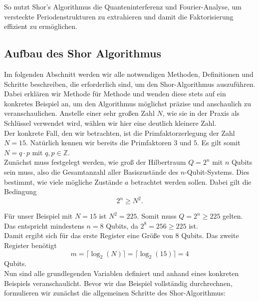 So nutzt Shor's Algorithmus die Quanteninterferenz und Fourier-Analyse, um versteckte Periodenstrukturen zu extrahieren und damit die Faktorisierung effizient zu ermöglichen.

\subsection{Aufbau des Shor Algorithmus}

Im folgenden Abschnitt werden wir alle notwendigen Methoden, Definitionen und Schritte beschreiben, die erforderlich sind, um den Shor-Algorithmus auszuführen. Dabei erklären wir Methode für Methode und wenden diese stets auf ein konkretes Beispiel an, um den Algorithmus möglichst präzise und anschaulich zu veranschaulichen. Anstelle einer sehr großen Zahl \( N \), wie sie in der Praxis als Schlüssel verwendet wird, wählen wir hier eine deutlich kleinere Zahl. \\

Der konkrete Fall, den wir betrachten, ist die Primfaktorzerlegung der Zahl \( N = 15 \). Natürlich kennen wir bereits die Primfaktoren \( 3 \) und \( 5 \). Es gilt somit \( N = q \cdot p \) mit \( q, p \in \mathbb{Z} \). \\

Zunächst muss festgelegt werden, wie groß der Hilbertraum \( Q = 2^n \) mit \( n \) Qubits sein muss, also die Gesamtanzahl aller Basiszustände des \( n \)-Qubit-Systems. Dies bestimmt, wie viele mögliche Zustände \( a \) betrachtet werden sollen. Dabei gilt die Bedingung
\[
2^n \geq N^2.
\]

Für unser Beispiel mit \( N = 15 \) ist \( N^2 = 225 \). Somit muss \( Q = 2^n \geq 225 \) gelten. Das entspricht mindestens \( n = 8 \) Qubits, da \( 2^8 = 256 \geq 225 \) ist. \\

Damit ergibt sich für das erste Register eine Größe von \( 8 \) Qubits. Das zweite Register benötigt
\[
m = \lceil \log_2(N) \rceil = \lceil \log_2(15) \rceil = 4
\]
Qubits.\\

Nun sind alle grundlegenden Variablen definiert und anhand eines konkreten Beispiels veranschaulicht. 
Bevor wir das Beispiel vollständig durchrechnen, formulieren wir zunächst die allgemeinen Schritte des Shor‑Algorithmus:

